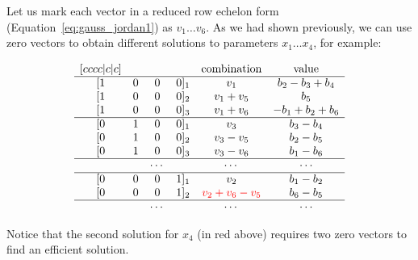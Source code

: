 Let us mark each vector in a reduced row echelon form (Equation~\ref{eq:gauss_jordan1}) as $v_1 \ldots v_6$.
As we had shown previously, we can use zero vectors to obtain different solutions to parameters $x_1 \ldots x_4$, for example:

\begin{equation}
\begin{matrix}[cccc|c|c]
    & & & & \mbox{combination} & \mbox{value} \\
    \hline
    [1 & 0 & 0 & 0]_1 & v_1 & b_2-b_3+b_4 \\
    [1 & 0 & 0 & 0]_2 & v_1+v_5 & b_5 \\
    [1 & 0 & 0 & 0]_3 & v_1+v_6 & -b_1 + b_2 + b_6 \\
    \hline
    [0 & 1 & 0 & 0]_1 & v_3 & b_3 - b_4 \\
    [0 & 1 & 0 & 0]_2 & v_3 - v_5 & b_2 - b_5 \\
    [0 & 1 & 0 & 0]_3 & v_3 - v_6 & b_1 - b_6 \\
    \hline
    & & \cdots & & \cdots & \cdots \\
    \hline
    [0 & 0 & 0 & 1]_1 & v_2 & b_1 - b_2 \\
    [0 & 0 & 0 & 1]_2 & \textcolor{red}{v_2  + v_6 - v_5}& b_6 - b_5 \\
    \hline
    & & \cdots & & \cdots & \cdots \\
\end{matrix}
\end{equation}

Notice that the second solution for $x_4$ (in red above) requires two zero vectors to find an efficient solution.


